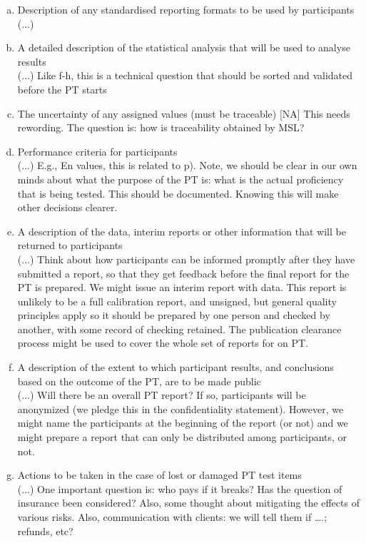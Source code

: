\begin{enumerate}[a)]
\item	Description of any standardised reporting formats to be used by participants \\
(...) 

\item	A detailed description of the statistical analysis that will be used to analyse results \\
(...)  Like f-h, this is a technical question that should be sorted and validated before the PT starts

\item	The uncertainty of any assigned values (must be traceable)
[NA] This needs rewording. The question is: how is traceability obtained by MSL?

\item	Performance criteria for participants\\
(...) E.g., En values, this is related to p). Note, we should be clear in our own minds about what the purpose of the PT is: what is the actual proficiency that is being tested. This should be documented. Knowing this will make other decisions clearer.

\item	A description of the data, interim reports or other information that will be returned to participants\\
(...) Think about how participants can be informed promptly after they have submitted a report, so that they get feedback before the final report for the PT is prepared. We might issue an interim report with data. This report is unlikely to be a full calibration report, and unsigned, but general quality principles apply so it should be prepared by one person and checked by another, with some record of checking retained. The publication clearance process might be used to cover the whole set of reports for on PT. 

\item	A description of the extent to which participant results, and conclusions based on the outcome of the PT, are to be made public\\
(...) Will there be an overall PT report? If so, participants will be anonymized (we pledge this in the confidentiality statement). However, we might name the participants at the beginning of the report (or not) and we might prepare a report that can only be distributed among participants, or not.

\item	Actions to be taken in the case of lost or damaged PT test items\\
(...) One important question is: who pays if it breaks? Has the question of insurance been considered? Also, some thought about mitigating the effects of various risks. Also, communication with clients: we will tell them if ….; refunds, etc?

\end{enumerate}


